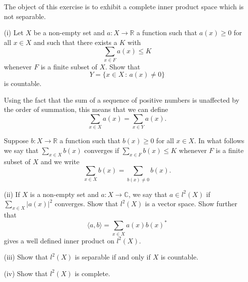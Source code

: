 \begin{exercise}\label{C5.17}\label{E;non-separable Hilbert}
The object of this exercise is to exhibit a complete inner product
space which is not separable.

(i) Let $X$ be a non-empty set and $a:X\rightarrow{\mathbb R}$
a function such that $a(x)\geq 0$ for all $x\in X$ and
such that there exists a $K$ with
\[\sum_{x\in F}a(x)\leq K\]
whenever $F$ is a finite subset of $X$. Show that
\[Y=\{x\in X\,:\,a(x)\neq 0\}\]
is countable.

Using the fact that the sum of a sequence of positive
numbers is unaffected by the order of summation, this means
that we can define
\[\sum_{x\in X}a(x)=\sum_{x\in Y}a(x).\]

Suppose $b:X\rightarrow{\mathbb R}$
a function such that $b(x)\geq 0$ for all $x\in X$.
In what follows we say that $\sum_{x\in X}b(x)$ converges
if $\sum_{x\in F}b(x)\leq K$
whenever $F$ is a finite subset of $X$ and we write
\[\sum_{x\in X}b(x)=\sum_{b(x)\neq 0}b(x).\]

(ii) If $X$ is a non-empty set and $a:X\rightarrow{\mathbb C}$,
we say that $a\in l^{2}(X)$ if $\sum_{x\in X}|a(x)|^{2}$ converges.
Show that  $l^{2}(X)$ is a vector space. Show further that
\[\langle a,b\rangle=\sum_{x\in X}a(x)b(x)^{*}\]
gives a well defined inner product on $l^{2}(X)$.

(iii) Show that $l^{2}(X)$ is separable if and only if $X$
is countable.

(iv) Show that $l^{2}(X)$ is complete.
\end{exercise}
